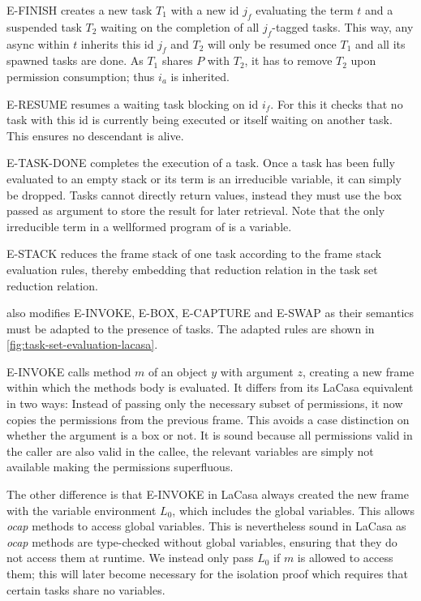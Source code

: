 E-FINISH creates a new task $T_1$ with a new id $j_f$ evaluating the term $t$ and a suspended task $T_2$ waiting on the completion of all $j_f$-tagged tasks. This way, any async within $t$ inherits this id $j_f$ and $T_2$ will only be resumed once $T_1$ and all its spawned tasks are done. As $T_1$ shares $P$ with $T_2$, it has to remove $T_2$ upon permission consumption; thus $i_a$ is inherited.

E-RESUME resumes a waiting task blocking on id $i_f$. For this it checks that no task with this id is currently being executed or itself waiting on another task. This ensures no descendant is alive.

E-TASK-DONE completes the execution of a task. Once a task has been fully evaluated to an empty stack or its term is an irreducible variable, it can simply be dropped. Tasks cannot directly return values, instead they must use the box passed as argument to store the result for later retrieval. Note that the only irreducible term in a wellformed program of \plc is a variable.

E-STACK reduces the frame stack of one task according to the frame stack evaluation rules, thereby embedding that reduction relation in the task set reduction relation.

\plc also modifies E-INVOKE, E-BOX, E-CAPTURE and E-SWAP as their semantics must be adapted to the presence of tasks. The adapted rules are shown in \cref{fig:task-set-evaluation-lacasa}.

E-INVOKE calls method $m$ of an object $y$ with argument $z$, creating a new frame within which the methods body is evaluated. It differs from its LaCasa equivalent in two ways: Instead of passing only the necessary subset of permissions, it now copies the permissions from the previous frame. This avoids a case distinction on whether the argument is a box or not. It is sound because all permissions valid in the caller are also valid in the callee, the relevant variables are simply not available making the permissions superfluous.

The other difference is that E-INVOKE in LaCasa always created the new frame with the variable environment $L_0$, which includes the global variables. This allows \textit{ocap} methods to access global variables. This is nevertheless sound in LaCasa as \textit{ocap} methods are type-checked without global variables, ensuring that they do not access them at runtime. We instead only pass $L_0$ if $m$ is allowed to access them; this will later become necessary for the isolation proof which requires that certain tasks share no variables.

